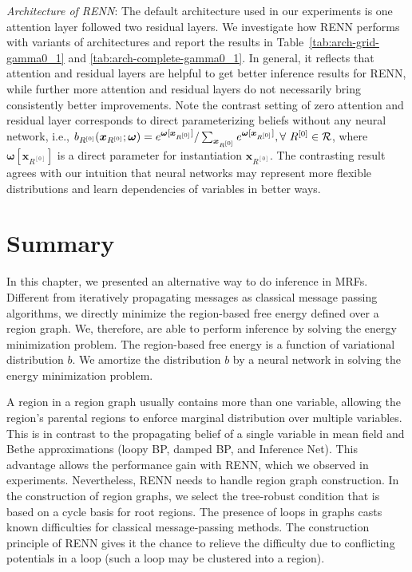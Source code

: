 \textit{Architecture of RENN}: The default architecture used in our experiments is one attention layer followed two residual layers. We investigate how RENN performs with variants of architectures and report the results in Table~\ref{tab:arch-grid-gamma0_1} and \ref{tab:arch-complete-gamma0_1}. In general, it reflects that attention and residual layers are helpful to get better inference results for RENN, while further more attention and residual layers do not necessarily bring consistently better improvements. {Note the contrast setting of zero attention and residual layer corresponds to direct parameterizing beliefs without any neural network}, i.e., 
$b_{R^{[0]}}(\bm{x}_{R^{[0]}}; \bm{\omega}) = e^{\bm{\omega}[\bm{x}_{R^{[0]}}]}/ \sum_{\bm{x}_{R^{[0]}}} e^{\bm{\omega}[\bm{x}_{R^{[0]}}]}, \forall~ {R^{[0]}} \in \mathcal{R}$, where ${\bm{\omega}[\bm{x}_{R^{[0]}}]}$ is a direct parameter for instantiation $\bm{x}_{R^{[0]}}$. The contrasting result agrees with our intuition that neural networks may represent more flexible distributions and learn dependencies of variables in better ways.

\section{Summary}
In this chapter, we presented an alternative way to do inference in MRFs. Different from iteratively propagating messages as classical message passing algorithms, we directly minimize the region-based free energy defined over a region graph. We, therefore, are able to perform inference by solving the energy minimization problem.
The region-based free energy is a function of variational distribution $b$. We amortize the distribution $b$ by a neural network in solving the energy minimization problem.

A region in a region graph usually contains more than one variable, allowing the region's parental regions to enforce marginal distribution over multiple variables. This is in contrast to the propagating belief of a single variable in mean field and Bethe approximations (loopy BP, damped BP, and Inference Net). This advantage allows the performance gain with RENN, which we observed in experiments. Nevertheless, RENN needs to handle region graph construction. In the construction of region graphs, we select the tree-robust condition that is based on a cycle basis for root regions. The presence of loops in graphs casts known difficulties for classical message-passing methods. The construction principle of RENN gives it the chance to relieve the difficulty due to conflicting potentials in a loop (such a loop may be clustered into a region).

